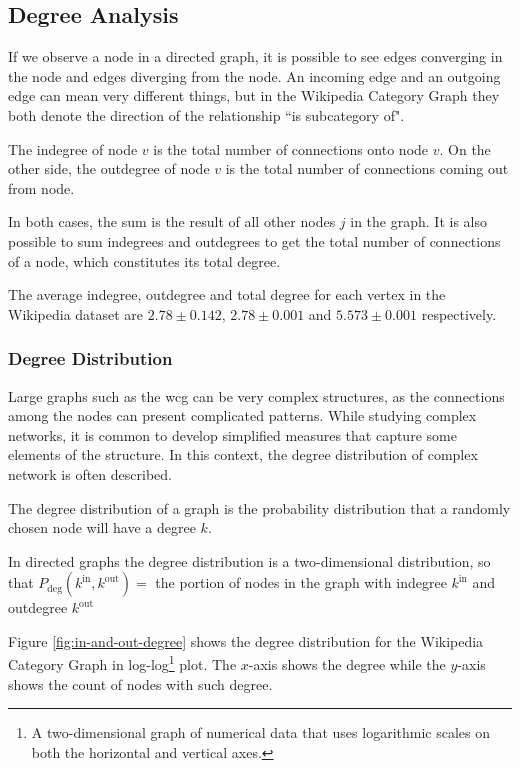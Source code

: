 \subsection{\hspace*{3pt} Degree Analysis}


If we observe a node in a directed graph, it is possible to see edges converging in the node and edges diverging from the node. An incoming edge and an outgoing edge can mean very different things, but in the Wikipedia Category Graph they both denote the direction of the relationship ``is subcategory of". 

The indegree of node $v$ is the total number of connections onto node $v$.
On the other side, the outdegree of node $v$ is the total number of connections coming out from node.

In both cases, the sum is the result of all other nodes $j$ in the graph. It is also possible to sum indegrees and outdegrees to get the total number of connections of a node, which constitutes its total degree.

The average indegree, outdegree and total degree for each vertex in the Wikipedia dataset are $2.78\pm0.142$, $2.78\pm0.001$ and $5.573\pm0.001$ respectively. 

\subsubsection{\hspace*{3pt}  Degree Distribution}

Large graphs such as the \gls{wcg} can be very complex structures, as the connections among the nodes can present complicated patterns. 
While studying complex networks, it is common to develop simplified measures that capture some elements of the structure. In this context, the degree distribution of complex network is often described. 

The degree distribution of a graph is the probability distribution that a randomly chosen node will have a degree $k$. 

In directed graphs the degree distribution is a two-dimensional distribution, so that $P_{\text{deg}}(k^{\text{in}},k^{\text{out}} ) =$ the portion of nodes in the graph with indegree $k^{\text{in}}$ and outdegree $k^{\text{out}}$

Figure \ref{fig:in-and-out-degree} shows the degree distribution for the Wikipedia Category Graph in log-log\footnote{
A two-dimensional graph of numerical data that uses logarithmic scales on both the horizontal and vertical axes. 
} plot. The $x$-axis shows the degree while the $y$-axis shows the count of nodes with such degree. 

